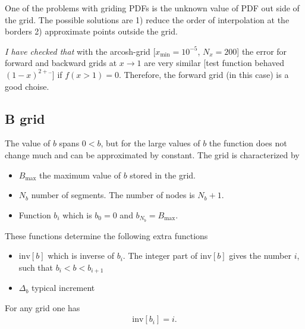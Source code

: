 \documentclass[prd,nofootinbib,eqsecnum,final]{revtex4}
\renewcommand{\(}{\left(}
\renewcommand{\)}{\right)}
\renewcommand{\[}{\left[}
\renewcommand{\]}{\right]}
\begin{document}
One of the problems with griding PDFs is the unknown value of PDF out side of the grid. The possible solutions are 1) reduce the order of interpolation at the borders 2) approximate points outside the grid. 

\textit{I have checked that} with the arcosh-grid [$x_\text{min}=10^{-5}$, $N_x=200$] the error for forward and backward grids at $x\to1$ are very similar [test function behaved $(1-x)^{2+..}$] if $f(x>1)=0$. Therefore, the forward grid (in this case) is a good choise.

\subsection{B grid}

The value of $b$ spans $0<b$, but for the large values of $b$ the function does not change much and can be approximated by constant. The grid is characterized by
\begin{itemize}
\item $B_{\text{max}}$ the maximum value of $b$ stored in the grid. 
\item $N_b$ number of segments. The number of nodes is $N_b+1$.
\item Function $b_i$ which is $b_0=0$ and $b_{N_b}=B_{\text{max}}$.
\end{itemize}
These functions determine the following extra functions
\begin{itemize}
\item $\text{inv}[b]$ which is inverse of $b_i$. The integer part of $\text{inv}[b]$ gives the number $i$, such that $b_{i}<b<b_{i+1}$
\item $\Delta_b$ typical increment
\end{itemize}
For any grid one has
\begin{eqnarray}
\text{inv}[b_{i}]=i.
\end{eqnarray}
\end{document}
